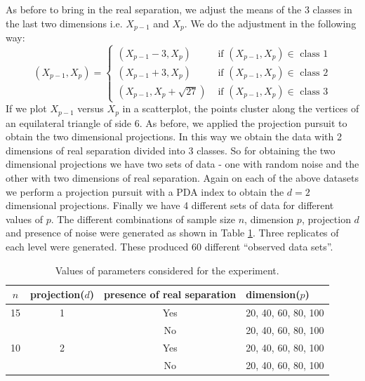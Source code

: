 \documentclass[12]{article}
\begin{document}
As before to bring in the real separation, we adjust the means of the 3 classes in the last two dimensions i.e. $X_{p-1}$ and $X_p$. We do the adjustment in the following way:
$$
(X_{p-1}, X_p) = \left\{ \begin{array}{rl}
 (X_{p-1} - 3, X_p) &\mbox{ if $(X_{p-1}, X_p) \in$ class 1} \\
 (X_{p-1} + 3, X_p) &\mbox{ if $(X_{p-1}, X_p) \in$ class 2} \\
 (X_{p-1} , X_p + \sqrt{27}) &\mbox{ if $(X_{p-1}, X_p) \in$ class 3}
       \end{array} \right.
$$
If we plot $X_{p-1}$ versus $X_p$ in a scatterplot, the points cluster along the vertices of an equilateral triangle of side 6. As before, we applied the projection pursuit to obtain the two dimensional projections. In this way we obtain the data with 2 dimensions of real separation divided into 3 classes. 
So for obtaining the two dimensional projections we have two sets of data - one with random noise and the other with two dimensions of real separation. Again on each of the above datasets we perform a projection pursuit with a PDA index to obtain the $d = 2$ dimensional projections. 
Finally we have 4 different sets of data for different values of $p$. The different combinations of sample size $n$, dimension $p$, projection $d$ and presence of noise were generated as shown in Table \ref{freq}. Three replicates of each level were generated. These produced 60 different ``observed data sets''. 

\begin{table}[htbp]
\begin{center}
\caption{Values of parameters considered for the experiment.}
\begin{tabular}{cccp{3cm}}
  \hline
  \hline
  $n$ & projection($d$) & presence of real separation & dimension($p$) \\
  \hline
  15 & 1 & Yes & 20, 40, 60, 80, 100 \\
      & & No & 20, 40, 60, 80, 100\\
   10 & 2 & Yes & 20, 40, 60, 80, 100 \\
     & & No & 20, 40, 60, 80, 100\\   
      \hline
\end{tabular}
\label{freq}
\end{center}
\end{table}
\end{document}
